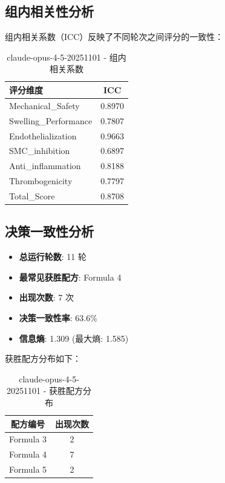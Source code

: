 \documentclass[12pt,a4paper]{article}
\begin{document}
\subsection{组内相关性分析}

组内相关系数（ICC）反映了不同轮次之间评分的一致性：

\begin{table}[H]
\centering
\caption{claude-opus-4-5-20251101 - 组内相关系数}
\begin{tabular}{lc}
\toprule
\textbf{评分维度} & \textbf{ICC} \\
\midrule
Mechanical\_Safety & 0.8970 \\
Swelling\_Performance & 0.7807 \\
Endothelialization & 0.9663 \\
SMC\_inhibition & 0.6897 \\
Anti\_inflammation & 0.8188 \\
Thrombogenicity & 0.7797 \\
Total\_Score & 0.8708 \\
\bottomrule
\end{tabular}
\end{table}

\subsection{决策一致性分析}


\begin{itemize}
    \item \textbf{总运行轮数}: 11 轮
    \item \textbf{最常见获胜配方}: Formula 4
    \item \textbf{出现次数}: 7 次
    \item \textbf{决策一致性率}: 63.6\%
    \item \textbf{信息熵}: 1.309 (最大熵: 1.585)
\end{itemize}

获胜配方分布如下：

\begin{table}[H]
\centering
\caption{claude-opus-4-5-20251101 - 获胜配方分布}
\begin{tabular}{cc}
\toprule
\textbf{配方编号} & \textbf{出现次数} \\
\midrule
Formula 3 & 2 \\
Formula 4 & 7 \\
Formula 5 & 2 \\
\bottomrule
\end{tabular}
\end{table}
\end{document}
